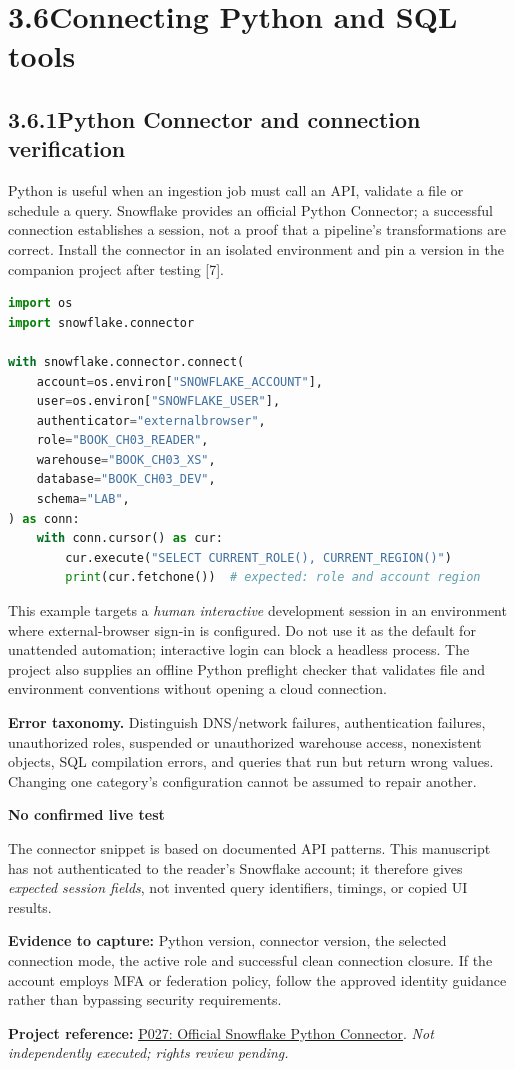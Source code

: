 \documentclass[11pt,twoside]{article}
\newcommand{\topic}[2]{\subsection*{#1\quad #2}}
\newcommand{\repo}[2]{\par\begingroup\fontsize{8.0}{9.6}\selectfont\sffamily\color{inkgray}\textbf{Project reference:} \href{#2}{#1}. \textit{Not independently executed; rights review pending.}\par\endgroup}
\begin{document}
\newpage
\section*{3.6\quad Connecting Python and SQL tools}
\topic{3.6.1}{Python Connector and connection verification}
Python is useful when an ingestion job must call an API, validate a file or schedule a query. Snowflake provides an official Python Connector; a successful connection establishes a session, not a proof that a pipeline's transformations are correct. Install the connector in an isolated environment and pin a version in the companion project after testing [7].

\begin{lstlisting}[language=Python,caption={Short connection-probe pattern; no embedded password.}]
import os
import snowflake.connector

with snowflake.connector.connect(
    account=os.environ["SNOWFLAKE_ACCOUNT"],
    user=os.environ["SNOWFLAKE_USER"],
    authenticator="externalbrowser",
    role="BOOK_CH03_READER",
    warehouse="BOOK_CH03_XS",
    database="BOOK_CH03_DEV",
    schema="LAB",
) as conn:
    with conn.cursor() as cur:
        cur.execute("SELECT CURRENT_ROLE(), CURRENT_REGION()")
        print(cur.fetchone())  # expected: role and account region
\end{lstlisting}
This example targets a \emph{human interactive} development session in an environment where external-browser sign-in is configured. Do not use it as the default for unattended automation; interactive login can block a headless process. The project also supplies an offline Python preflight checker that validates file and environment conventions without opening a cloud connection.

\textbf{Error taxonomy.} Distinguish DNS/network failures, authentication failures, unauthorized roles, suspended or unauthorized warehouse access, nonexistent objects, SQL compilation errors, and queries that run but return wrong values. Changing one category's configuration cannot be assumed to repair another.

\begin{whitebox}
\textbf{No confirmed live test}\par
The connector snippet is based on documented API patterns. This manuscript has not authenticated to the reader's Snowflake account; it therefore gives \emph{expected session fields}, not invented query identifiers, timings, or copied UI results.
\end{whitebox}
\textbf{Evidence to capture:} Python version, connector version, the selected connection mode, the active role and successful clean connection closure. If the account employs MFA or federation policy, follow the approved identity guidance rather than bypassing security requirements.
\repo{P027: Official Snowflake Python Connector}{https://github.com/snowflakedb/snowflake-connector-python}
\end{document}
